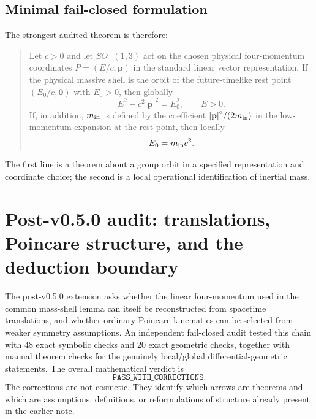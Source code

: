 \documentclass[11pt,a4paper]{article}
\begin{document}
\subsection{Minimal fail-closed formulation}
The strongest audited theorem is therefore:
\begin{quote}
Let $c>0$ and let $SO^+(1,3)$ act on the chosen physical four-momentum coordinates $P=(E/c,\mathbf p)$ in the standard linear vector representation.  If the physical massive shell is the orbit of the future-timelike rest point $(E_0/c,\mathbf0)$ with $E_0>0$, then globally
\[
E^2-c^2|\mathbf p|^2=E_0^2,\qquad E>0.
\]
If, in addition, $m_{\rm in}$ is defined by the coefficient $|\mathbf p|^2/(2m_{\rm in})$ in the low-momentum expansion at the rest point, then locally
\[
E_0=m_{\rm in}c^2.
\]
\end{quote}
The first line is a theorem about a group orbit in a specified representation and coordinate choice; the second is a local operational identification of inertial mass.



\section{Post-v0.5.0 audit: translations, Poincare structure, and the deduction boundary}
The post-v0.5.0 extension asks whether the linear four-momentum used in the common mass-shell lemma can itself be reconstructed from spacetime translations, and whether ordinary Poincare kinematics can be selected from weaker symmetry assumptions.  An independent fail-closed audit tested this chain with 48 exact symbolic checks and 20 exact geometric checks, together with manual theorem checks for the genuinely local/global differential-geometric statements.  The overall mathematical verdict is
\begin{equation}
\boxed{\texttt{PASS\_WITH\_CORRECTIONS}}.
\end{equation}
The corrections are not cosmetic.  They identify which arrows are theorems and which are assumptions, definitions, or reformulations of structure already present in the earlier note.
\end{document}
